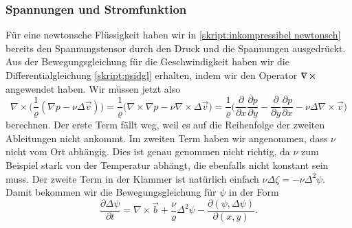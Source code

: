 \subsubsection{Spannungen und Stromfunktion}
Für eine newtonsche Flüssigkeit haben wir in 
\eqref{skript:inkompressibel newtonsch}
bereits den Spannungstensor durch den Druck und die Spannungen
ausgedrückt.
Aus der Bewegungsgleichung für die Geschwindigkeit haben wir die
Differentialgleichung \eqref{skript:psidgl} erhalten, indem
wir den Operator $\nabla\times\mathstrut$ angewendet haben.
Wir müssen jetzt also 
\[
\nabla\times\biggl(\frac1{\varrho}(\nabla p-\nu\Delta\vec{v})\biggr)
=
\frac{1}{\varrho}
\biggl(
\nabla\times\nabla p
-
\nu \nabla\times\Delta\vec{v}
\biggr)
=
\frac1{\varrho}
\biggl(
\frac{\partial}{\partial x}\frac{\partial p}{\partial y}
-
\frac{\partial}{\partial y}\frac{\partial p}{\partial x}
-\nu\Delta\nabla\times\vec{v}
\biggr)
\]
berechnen.
Der erste Term fällt weg, weil es auf die Reihenfolge der zweiten
Ableitungen nicht ankommt.
Im zweiten Term haben wir angenommen, dass $\nu$ nicht vom Ort
abhängig.
Dies ist genau genommen nicht richtig, da $\nu$ zum Beispiel
stark von der Temperatur abhängt, die ebenfalls nicht konstant sein
muss.
Der zweite Term in der Klammer ist natürlich einfach
$\nu\Delta\zeta=-\nu\Delta^2\psi$.
Damit bekommen wir die Bewegungsgleichung für $\psi$ in der Form
\begin{equation}
\frac{\partial \Delta \psi}{\partial t}
=
\nabla\times\vec b
+\frac{\nu}{\varrho}\Delta^2\psi
-\frac{\partial(\psi,\Delta\psi)}{\partial(x,y)}.
\label{skript:psidgl2}
\end{equation}

